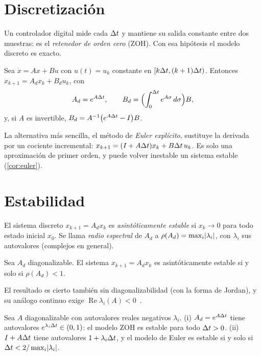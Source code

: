 \addtocounter{definicion}{1}%
\addtocounter{equation}{1}%

\section{Discretización}

Un controlador digital mide cada $\Delta t$ y mantiene su salida constante entre dos muestras: es el \emph{retenedor de orden cero} (ZOH). Con esa hipótesis el modelo discreto es exacto.

\begin{proposicion}\label{prop:zoh}
Sea $\dot x=Ax+Bu$ con $u(t)=u_k$ constante en $[k\Delta t,(k+1)\Delta t)$. Entonces $x_{k+1}=A_dx_k+B_du_k$, con
\[
A_d=e^{A\Delta t},\qquad B_d=\Bigl(\int_0^{\Delta t}e^{A\sigma}\,d\sigma\Bigr)B,
\]
y, si $A$ es invertible, $B_d=A^{-1}\bigl(e^{A\Delta t}-I\bigr)B$.
\end{proposicion}

La alternativa más sencilla, el método de \emph{Euler explícito}, sustituye la derivada por un cociente incremental: $x_{k+1}=(I+A\Delta t)x_k+B\Delta t\,u_k$. Es solo una aproximación de primer orden, y puede volver inestable un sistema estable (\cref{cor:euler}).

\addtocounter{definicion}{1}%
\addtocounter{equation}{1}%

\section{Estabilidad}

\begin{definicion}\label{def:estab}
El sistema discreto $x_{k+1}=A_dx_k$ es \emph{asintóticamente estable} si $x_k\to 0$ para todo estado inicial $x_0$. Se llama \emph{radio espectral} de $A_d$ a $\rho(A_d)=\max_i\lvert\lambda_i\rvert$, con $\lambda_i$ sus autovalores (complejos en general).
\end{definicion}

\begin{teorema}\label{teo:estab}
Sea $A_d$ diagonalizable. El sistema $x_{k+1}=A_dx_k$ es asintóticamente estable si y solo si $\rho(A_d)<1$.
\end{teorema}

El resultado es cierto también sin diagonalizabilidad (con la forma de Jordan), y su análogo continuo exige $\operatorname{Re}\lambda_i(A)<0$~\cite[cap.~6]{am}.

\begin{corolario}\label{cor:euler}
Sea $A$ diagonalizable con autovalores reales negativos $\lambda_i$. (i) $A_d=e^{A\Delta t}$ tiene autovalores $e^{\lambda_i\Delta t}\in(0,1)$: el modelo ZOH es estable para todo $\Delta t>0$. (ii) $I+A\Delta t$ tiene autovalores $1+\lambda_i\Delta t$, y el modelo de Euler es estable si y solo si $\Delta t<2/\max_i\lvert\lambda_i\rvert$.
\end{corolario}

